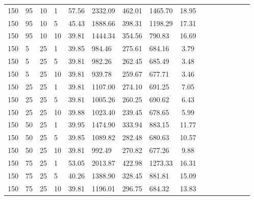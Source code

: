 \begin{center}
\begin{table}[h]
\begin{tabular}{clclclclclclclc|c}
150 & 95 & 10 & 1 & \cellcolor{gray!1}57.56 & \cellcolor{gray!1}2332.09 & \cellcolor{gray!1}462.01 & \cellcolor{gray!1}1465.70 & 18.95\\
150 & 95 & 10 & 5 & \cellcolor{gray!1}45.43 & \cellcolor{gray!1}1888.66 & \cellcolor{gray!1}398.31 & \cellcolor{gray!1}1198.29 & 17.31\\
150 & 95 & 10 & 10 & \cellcolor{gray!50}39.81 & \cellcolor{gray!1}1444.34 & \cellcolor{gray!1}354.56 & \cellcolor{gray!15}790.83 & 16.69\\
150 & 5 & 25 & 1 & \cellcolor{gray!50}39.85 & \cellcolor{gray!40}984.46 & \cellcolor{gray!6}275.61 & \cellcolor{gray!48}684.16 & 3.79\\
150 & 5 & 25 & 5 & \cellcolor{gray!50}39.81 & \cellcolor{gray!41}982.26 & \cellcolor{gray!21}262.45 & \cellcolor{gray!48}685.49 & 3.48\\
150 & 5 & 25 & 10 & \cellcolor{gray!50}39.81 & \cellcolor{gray!49}939.78 & \cellcolor{gray!24}259.67 & \cellcolor{gray!50}677.71 & 3.46\\
150 & 25 & 25 & 1 & \cellcolor{gray!50}39.81 & \cellcolor{gray!17}1107.00 & \cellcolor{gray!7}274.10 & \cellcolor{gray!46}691.25 & 7.05\\
150 & 25 & 25 & 5 & \cellcolor{gray!50}39.81 & \cellcolor{gray!36}1005.26 & \cellcolor{gray!23}260.25 & \cellcolor{gray!46}690.62 & 6.43\\
150 & 25 & 25 & 10 & \cellcolor{gray!50}39.88 & \cellcolor{gray!33}1023.40 & \cellcolor{gray!47}239.45 & \cellcolor{gray!50}678.65 & 5.99\\
150 & 50 & 25 & 1 & \cellcolor{gray!49}39.95 & \cellcolor{gray!1}1474.90 & \cellcolor{gray!1}333.94 & \cellcolor{gray!1}883.15 & 11.77\\
150 & 50 & 25 & 5 & \cellcolor{gray!50}39.85 & \cellcolor{gray!20}1089.82 & \cellcolor{gray!1}282.48 & \cellcolor{gray!49}680.63 & 10.57\\
150 & 50 & 25 & 10 & \cellcolor{gray!50}39.81 & \cellcolor{gray!39}992.49 & \cellcolor{gray!11}270.82 & \cellcolor{gray!50}677.26 & 9.88\\
150 & 75 & 25 & 1 & \cellcolor{gray!1}53.05 & \cellcolor{gray!1}2013.87 & \cellcolor{gray!1}422.98 & \cellcolor{gray!1}1273.33 & 16.31\\
150 & 75 & 25 & 5 & \cellcolor{gray!46}40.26 & \cellcolor{gray!1}1388.90 & \cellcolor{gray!1}328.45 & \cellcolor{gray!1}881.81 & 15.09\\
150 & 75 & 25 & 10 & \cellcolor{gray!50}39.81 & \cellcolor{gray!1}1196.01 & \cellcolor{gray!1}296.75 & \cellcolor{gray!48}684.32 & 13.83\\

\end{tabular}
\end{table}
\end{center}
